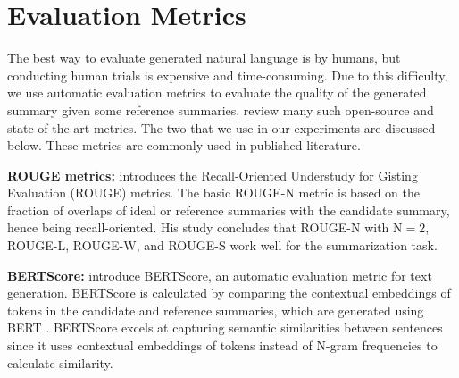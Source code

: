 \section{Evaluation Metrics}
\label{sec:metrics}

The best way to evaluate generated natural language is by humans, but conducting human trials is expensive and time-consuming.
Due to this difficulty, we use automatic evaluation metrics to evaluate the quality of the generated summary given some reference summaries.
\citet{fabbri2021summeval} review many such open-source and state-of-the-art metrics.
The two that we use in our experiments are discussed below.
These metrics are commonly used in published literature.

\textbf{ROUGE metrics:} \citet{lin-2004-rouge} introduces the Recall-Oriented Understudy for Gisting Evaluation (ROUGE) metrics.
The basic ROUGE-N metric is based on the fraction of overlaps of ideal or reference summaries with the candidate summary, hence being recall-oriented.
His study concludes that ROUGE-N with $\text{N} = 2$, ROUGE-L, ROUGE-W, and ROUGE-S work well for the summarization task.

\textbf{BERTScore:} \citet{zhang2019bertscore} introduce BERTScore, an automatic evaluation metric for text generation.
BERTScore is calculated by comparing the contextual embeddings of tokens in the candidate and reference summaries, which are generated using BERT \cite{devlin2018bert}.
BERTScore excels at capturing semantic similarities between sentences since it uses contextual embeddings of tokens instead of N-gram frequencies to calculate similarity.

